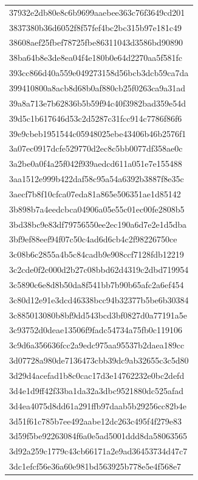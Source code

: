 \begin{tabular}{l}
37932e2db80e8c6b9699aaebee363c76f3649cd201 \\
3837380b36d6052f8f57fef4bc2bc315b97e181c49 \\
38608aef25fbef78725fbe86311043d3586bd90890 \\
38ba64b8e3de8ea04f4e180b0e64d2270aa5f581fc \\
393cc866d40a559e049273158d56bcb3dcb59ca7da \\
399410800a8acb8d68b0af880cb25f0263ca9a31ad \\
39a8a713e7b62836b5b59f94c40f3982bad359e54d \\
39d5c1b617646d53c2d5287c31fcc914c7786f86f6 \\
39e9cbeb1951544c05948025ebe43406b46b2576f1 \\
3a07ec0917dcfe529770d2ec8c5bb0077df358ae0c \\
3a2be0a0f4a25f042f939aedcd611a051e7e155488 \\
3aa1512e999b422daf58c95a54a6392b3887f8e35c \\
3aecf7b8f10cfca07eda81a865e506351ae1d85142 \\
3b898b7a4eedcbca04906a05e55c01ec00fe2808b5 \\
3bd38bc9e83df79756550ee2ec190a6d7e2e1d5dba \\
3bf9ef88eef94f07c50c4ad6d6cb4c2f98226750ce \\
3c08b6c2855a4b5c84cadb9e908ccf7128fdb12219 \\
3c2cde0f2c000d2b27c08bbd62d4319c2dbd719954 \\
3c5890c6e8d8b50da8f541bb7b90b65afc2a6ef454 \\
3c80d12e91e3dcd46338bcc94b32377b5be6b30384 \\
3c885013080b8bf9dd543bcd3bf0827d0a77191a5e \\
3c93752d0deae13506f9fadc54734a75fb0c119106 \\
3c9d6a356636fcc2a9edc975aa95537b2daea189cc \\
3d07728a980de7136473cbb39dc9ab32655c3c5d80 \\
3d29d4acefad1b8c0cac17d3e14762232e0bc2defd \\
3d4e1d9ff42f33ba1da32a3dbc9521880dc525afad \\
3d4ea4075d8dd61a291ffb97daab5b29256cc82b4e \\
3d51f61c785b7ee492aabe12dc263c495f4f279e83 \\
3d59f5be92263084f6a0e5ad5001ddd8da58063565 \\
3d92a259c1779c43cb66171a2e9ad36453734d47c7 \\
3dc1efcf56e36a60e981bd563925b778e5e4f568e7 \\

\end{tabular}
